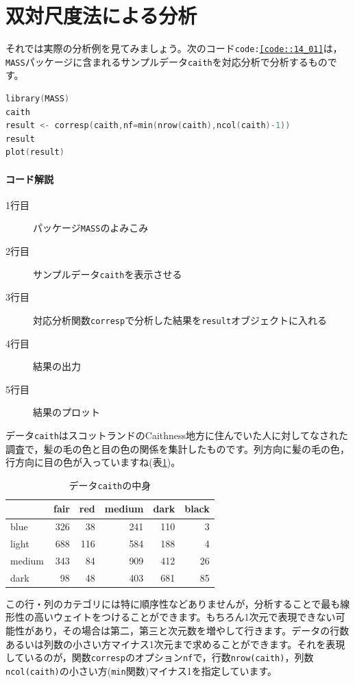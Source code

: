 \documentclass{ltjsbook}
\begin{document}
\section{双対尺度法による分析}
それでは実際の分析例を見てみましょう。次のコード\texttt{code:\ref{code::14_01}}は，\texttt{MASS}パッケージに含まれるサンプルデータ\texttt{caith}を対応分析で分析するものです。

\begin{lstlisting}[language=c++,label={code::14_01},caption={双対尺度法による分析}]
library(MASS)
caith
result <- corresp(caith,nf=min(nrow(caith),ncol(caith)-1))
result
plot(result)
\end{lstlisting}

\paragraph{コード解説}
\begin{description}
    \item[1行目] パッケージ\texttt{MASS}のよみこみ
    \item[2行目] サンプルデータ\texttt{caith}を表示させる
    \item[3行目] 対応分析関数\texttt{corresp}で分析した結果を\texttt{result}オブジェクトに入れる
    \item[4行目] 結果の出力
    \item[5行目] 結果のプロット
\end{description}

データ\texttt{caith}はスコットランドのCaithness地方に住んでいた人に対してなされた調査で，髪の毛の色と目の色の関係を集計したものです。列方向に髪の毛の色，行方向に目の色が入っていますね(表\ref{tbl::14_06})。

\begin{table}[h]
	\caption{データ\texttt{caith}の中身}
    \centering
	\begin{tabular}{lrrrrr}
	\hline
	  & fair & red & medium & dark & black\\\hline
	\hline
	blue & 326 & 38 & 241 & 110 & 3\\
	light & 688 & 116 & 584 & 188 & 4\\
	medium & 343 & 84 & 909 & 412 & 26\\
	dark & 98 & 48 & 403 & 681 & 85\\
	\hline
	\end{tabular}
	\label{tbl::14_06}
\end{table}

この行・列のカテゴリには特に順序性などありませんが，分析することで最も線形性の高いウェイトをつけることができます。もちろん1次元で表現できない可能性があり，その場合は第二，第三と次元数を増やして行きます。データの行数あるいは列数の小さい方マイナス1次元まで求めることができます。それを表現しているのが，関数\texttt{corresp}のオプション\texttt{nf}で，行数\texttt{nrow(caith)}，列数\texttt{ncol(caith)}の小さい方(\texttt{min}関数)マイナス1を指定しています。
\end{document}
